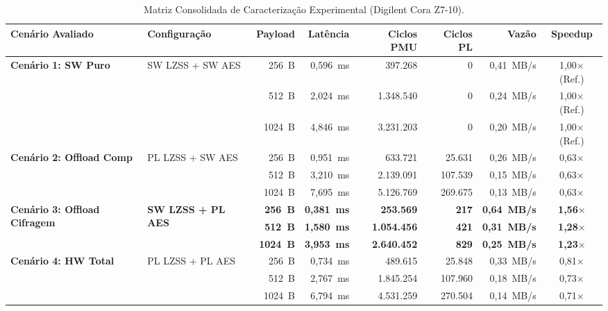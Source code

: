 \documentclass[11pt,a4paper]{article}
\begin{document}
\begin{table}[htbp]
  \centering
  \small
  \caption{Matriz Consolidada de Caracterização Experimental (Digilent Cora Z7-10).}
  \label{tab:benchmark_matrix}
  \begin{tabular}{@{}llrrrrrc@{}}
    \toprule
    \textbf{Cenário Avaliado} & \textbf{Configuração} & \textbf{Payload} & \textbf{Latência} & \textbf{Ciclos PMU} & \textbf{Ciclos PL} & \textbf{Vazão} & \textbf{Speedup} \\
    \midrule
    \multirow{3}{*}{\textbf{Cenário 1: SW Puro}} 
      & \multirow{3}{*}{SW LZSS + SW AES} & 256~B & 0,596~ms & 397.268 & 0 & 0,41~MB/s & 1,00$\times$ (Ref.) \\
      &                                    & 512~B & 2,024~ms & 1.348.540 & 0 & 0,24~MB/s & 1,00$\times$ (Ref.) \\
      &                                    & 1024~B & 4,846~ms & 3.231.203 & 0 & 0,20~MB/s & 1,00$\times$ (Ref.) \\
    \midrule
    \multirow{3}{*}{\textbf{Cenário 2: Offload Comp}} 
      & \multirow{3}{*}{PL LZSS + SW AES} & 256~B & 0,951~ms & 633.721 & 25.631 & 0,26~MB/s & 0,63$\times$ \\
      &                                    & 512~B & 3,210~ms & 2.139.091 & 107.539 & 0,15~MB/s & 0,63$\times$ \\
      &                                    & 1024~B & 7,695~ms & 5.126.769 & 269.675 & 0,13~MB/s & 0,63$\times$ \\
    \midrule
    \multirow{3}{*}{\textbf{Cenário 3: Offload Cifragem}} 
      & \multirow{3}{*}{\textbf{SW LZSS + PL AES}} & \textbf{256~B} & \textbf{0,381~ms} & \textbf{253.569} & \textbf{217} & \textbf{0,64~MB/s} & \textbf{1,56$\times$} \\
      &                                             & \textbf{512~B} & \textbf{1,580~ms} & \textbf{1.054.456} & \textbf{421} & \textbf{0,31~MB/s} & \textbf{1,28$\times$} \\
      &                                             & \textbf{1024~B} & \textbf{3,953~ms} & \textbf{2.640.452} & \textbf{829} & \textbf{0,25~MB/s} & \textbf{1,23$\times$} \\
    \midrule
    \multirow{3}{*}{\textbf{Cenário 4: HW Total}} 
      & \multirow{3}{*}{PL LZSS + PL AES} & 256~B & 0,734~ms & 489.615 & 25.848 & 0,33~MB/s & 0,81$\times$ \\
      &                                    & 512~B & 2,767~ms & 1.845.254 & 107.960 & 0,18~MB/s & 0,73$\times$ \\
      &                                    & 1024~B & 6,794~ms & 4.531.259 & 270.504 & 0,14~MB/s & 0,71$\times$ \\
    \bottomrule
  \end{tabular}
\end{table}
\end{document}

